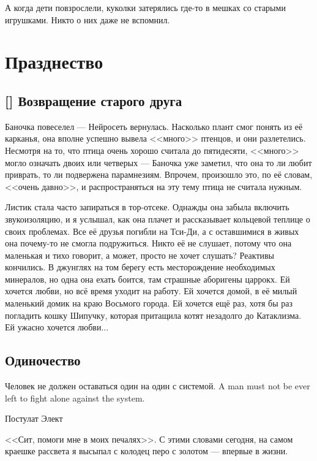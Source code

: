 А когда дети повзрослели, куколки затерялись где-то в мешках со старыми игрушками.
Никто о них даже не вспомнил.

\chapter{Празднество}

\section{[] Возвращение старого друга}

\textspace

Баночка повеселел --- Нейросеть вернулась.
Насколько плант смог понять из её карканья, она вполне успешно вывела <<много>> птенцов, и они разлетелись.
Несмотря на то, что птица очень хорошо считала до пятидесяти, <<много>> могло означать двоих или четверых --- Баночка уже заметил, что она то ли любит приврать, то ли подвержена парамнезиям.
Впрочем, произошло это, по её словам, <<очень давно>>, и распространяться на эту тему птица не считала нужным.

\textspace

Листик стала часто запираться в тор-отсеке.
Однажды она забыла включить звукоизоляцию, и я услышал, как она плачет и рассказывает кольцевой теплице о своих проблемах.
Все её друзья погибли на Тси-Ди, а с оставшимися в живых она почему-то не смогла подружиться.
Никто её не слушает, потому что она маленькая и тихо говорит, а может, просто не хочет слушать?
Реактивы кончились.
В джунглях на том берегу есть месторождение необходимых минералов, но одна она ехать боится, там страшные аборигены царрокх.
Ей хочется любви, но всё время уходит на работу.
Ей хочется домой, в её милый маленький домик на краю Восьмого города.
Ей хочется ещё раз, хотя бы раз погладить кошку Шипучку, которая притащила котят незадолго до Катаклизма.
Ей ужасно хочется любви...

\section{Одиночество}

\epigraph{
{Человек не должен оставаться один на один с системой.}
{A man must not be ever left to fight alone against the system.}
}{Постулат Элект}

<<Сит, помоги мне в моих печалях>>.
С этими словами сегодня, на самом краешке рассвета я высыпал с колодец перо с золотом --- впервые в жизни.

